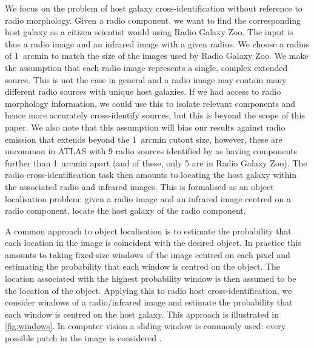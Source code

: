 \documentclass[fleqn,usenatbib,usedcolumn]{mnras}
\begin{document}
    We focus on the problem of host galaxy cross-identification without
    reference to radio morphology. Given a radio component, we want to find
    the corresponding host galaxy as a citizen scientist would using Radio
    Galaxy Zoo. The input is thus a radio image and an infrared image with a
    given radius. We choose a radius of 1~arcmin to match the size of the
    images used by Radio Galaxy Zoo. We make the assumption that each radio
    image represents a single, complex extended source. This is not the case
    in general and a radio image may contain many different radio sources with
    unique host galaxies. If we had access to radio morphology information, we
    could use this to isolate relevant components and hence more accurately
    cross-identify sources, but this is beyond the scope of this paper. We
    also note that this assumption will bias our results against radio
    emission that extends beyond the 1~arcmin cutout size, however, these are
    uncommon in ATLAS with 9 radio sources identified by \citet{norris06} as
    having components further than 1~arcmin apart (and of these, only 5 are in
    Radio Galaxy Zoo). The radio cross-identification task then amounts to
    locating the host galaxy within the associated radio and infrared images.
    This is formalised as an object localisation problem: given a radio image
    and an infrared image centred on a radio component, locate the host galaxy
    of the radio component.    %

    A common approach to object localisation is to estimate the probability
    that each location in the image is coincident with the desired object. In
    practice this amounts to taking fixed-size windows of the image centred on
    each pixel and estimating the probability that each window is centred on
    the object. The location associated with the highest probability window is
    then assumed to be the location of the object. Applying this to radio host
    cross-identification, we consider windows of a radio/infrared image and
    estimate the probability that each window is centred on the host galaxy.
    This approach is illustrated in \autoref{fig:windows}. In computer vision
    a sliding window is commonly used: every possible patch in the image is
    considered \citep[e.g.][]{rowley1996facedetection}.
\end{document}

